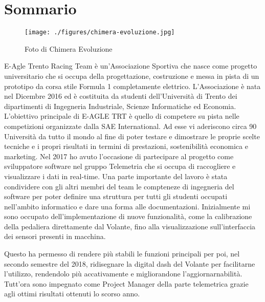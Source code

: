\chapter*{Sommario} %
\label{sommario}


\begin{figure}[h]
  \centering
  \texttt{[image: ./figures/chimera-evoluzione.jpg]}
  \caption{Foto di Chimera Evoluzione}
\end{figure}

E-Agle Trento Racing Team è un'Associazione Sportiva che nasce come progetto universitario
che si occupa della progettazione, costruzione e messa in pista di un prototipo da corsa stile Formula 1 completamente elettrico. 
L'Associazione è nata nel Dicembre 2016 ed è costituita da studenti dell'Università di Trento 
dei dipartimenti di Ingegneria Industriale, Scienze Informatiche ed Economia. 
L'obiettivo principale di E-AGLE TRT è quello di competere su pista nelle competizioni organizzate dalla SAE International. 
Ad esse vi aderiscono circa 90 Università da tutto il mondo al fine di poter testare e 
dimostrare le proprie scelte tecniche e i propri risultati in termini di prestazioni, sostenibilità economica e marketing.
Nel 2017 ho avuto l'occasione di partecipare al progetto come sviluppatore software nel gruppo Telemetria 
che si occupa di raccogliere e visualizzare i dati in real-time. 
Una parte importante del lavoro è stata condividere con gli altri membri del team 
le compteneze di ingegneria del software per poter definire una struttura per tutti gli studenti occupati nell'ambito informatico
e dare una forma alle documentazioni.
Inizialmente mi sono occupato dell'implementazione di nuove funzionalità, come la calibrazione della pedaliera direttamente dal Volante,
fino alla visualizzazione sull'interfaccia dei sensori presenti in macchina.

Questo ha permesso di rendere più stabili le funzioni principali per poi, nel secondo semestre del 2018, ridisegnare la digital dash
del Volante per facilitarne l'utilizzo, rendendolo più accativamente e migliorandone l'aggiornarnabilità.     
Tutt'ora sono impegnato come Project Manager della parte telemetrica grazie agli ottimi risultati ottenuti lo scorso anno.  

\newpage




